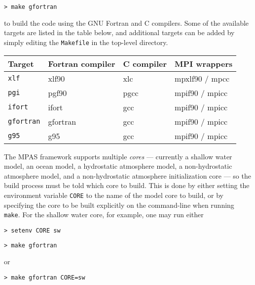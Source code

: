 \vspace{12pt}
{\tt > make gfortran}
\vspace{12pt}

\noindent to build the code using the GNU Fortran and C compilers. Some of the available targets are listed in the table below, and additional
targets can be added by simply editing the {\tt Makefile} in the top-level directory.

\vspace{12pt}
\begin{longtable}{| l | l | l | l |}
\hline
Target & Fortran compiler & C compiler & MPI wrappers \\ \hline \hline
{\tt xlf} & xlf90 & xlc & mpxlf90 / mpcc \\ \hline
{\tt pgi} & pgf90 & pgcc & mpif90 / mpicc \\ \hline
{\tt ifort} & ifort & gcc & mpif90 / mpicc \\ \hline
{\tt gfortran} & gfortran & gcc & mpif90 / mpicc \\ \hline
{\tt g95} & g95 & gcc & mpif90 / mpicc \\ \hline
\end{longtable}
\vspace{12pt}


The MPAS framework supports multiple {\em cores} --- currently a shallow water
model, an ocean model, a hydrostatic atmosphere model, a non-hydrostatic atmosphere model, and a non-hydrostatic atmosphere initialization core --- so the build
process must be told which core to build. This is done by either setting the environment variable
{\tt CORE} to the name of the model core to build, or by specifying the core to be built explicitly on the command-line
when running {\tt make}. For the shallow water core, for example, one may run either

\vspace{12pt}
{\tt > setenv CORE sw}

{\tt > make gfortran}
\vspace{12pt}

\noindent or

\vspace{12pt}
{\tt > make gfortran CORE=sw}
\vspace{12pt}

